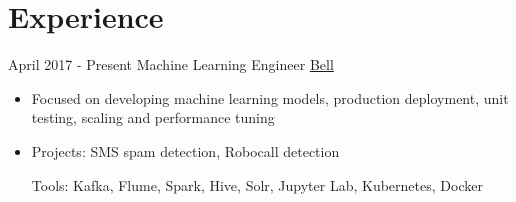 \documentclass[letterpaper]{twentysecondcv} %
\begin{document}
\makeprofile %


\section{Experience}

\begin{twenty} %
  \twentyitem
  {April 2017 -}
  {Present}
  {Machine Learning Engineer}
  {\href{http://www.bell.ca/}{Bell}}
  {}
  {
    \begin{itemize}
    \item Focused on developing machine learning models, production deployment,  unit testing, scaling and performance tuning
    \item Projects: SMS spam detection, Robocall detection 
      
      Tools: Kafka, Flume, Spark, Hive, Solr, Jupyter Lab, Kubernetes, Docker
      

\end{itemize}}
\end{twenty}
\end{document}
